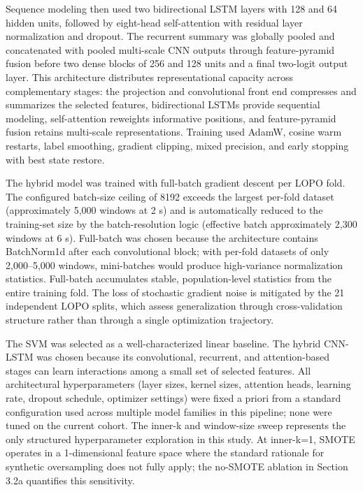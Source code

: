 Sequence modeling then used two bidirectional LSTM layers with 128 and 64 hidden units, followed by eight-head self-attention with residual layer normalization and dropout. The recurrent summary was globally pooled and concatenated with pooled multi-scale CNN outputs through feature-pyramid fusion before two dense blocks of 256 and 128 units and a final two-logit output layer. This architecture distributes representational capacity across complementary stages: the projection and convolutional front end compresses and summarizes the selected features, bidirectional LSTMs provide sequential modeling, self-attention reweights informative positions, and feature-pyramid fusion retains multi-scale representations. Training used AdamW, cosine warm restarts, label smoothing, gradient clipping, mixed precision, and early stopping with best state restore.

The hybrid model was trained with full-batch gradient descent per LOPO fold. The configured batch-size ceiling of 8192 exceeds the largest per-fold dataset (approximately 5,000 windows at 2 s) and is automatically reduced to the training-set size by the batch-resolution logic (effective batch approximately 2,300 windows at 6 s). Full-batch was chosen because the architecture contains BatchNorm1d after each convolutional block; with per-fold datasets of only 2,000--5,000 windows, mini-batches would produce high-variance normalization statistics. Full-batch accumulates stable, population-level statistics from the entire training fold. The loss of stochastic gradient noise is mitigated by the 21 independent LOPO splits, which assess generalization through cross-validation structure rather than through a single optimization trajectory.

The SVM was selected as a well-characterized linear baseline. The hybrid CNN-LSTM was chosen because its convolutional, recurrent, and attention-based stages can learn interactions among a small set of selected features. All architectural hyperparameters (layer sizes, kernel sizes, attention heads, learning rate, dropout schedule, optimizer settings) were fixed a priori from a standard configuration used across multiple model families in this pipeline; none were tuned on the current cohort. The inner-k and window-size sweep represents the only structured hyperparameter exploration in this study. At inner-k=1, SMOTE operates in a 1-dimensional feature space where the standard rationale for synthetic oversampling does not fully apply; the no-SMOTE ablation in Section 3.2a quantifies this sensitivity.

